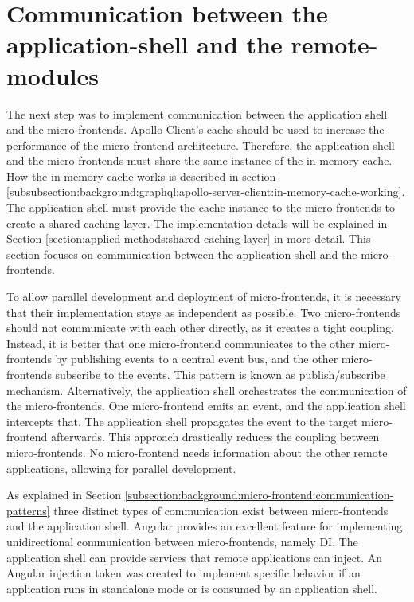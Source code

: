 \section{Communication between the application-shell and the remote-modules}\label{section:applied-methods:communication-shell-remote}

The next step was to implement communication between the application shell and the micro-frontends. Apollo Client's cache should be used to increase the performance of the micro-frontend architecture. Therefore, the application shell and the micro-frontends must share the same instance of the in-memory cache. How the in-memory cache works is described in section  \ref{subsubsection:background:graphql:apollo-server-client:in-memory-cache-working}. The application shell must provide the cache instance to the micro-frontends to create a shared caching layer. The implementation details will be explained in Section \ref{section:applied-methods:shared-caching-layer} in more detail. This section focuses on communication between the application shell and the micro-frontends.

\bigskip

\noindent To allow parallel development and deployment of micro-frontends, it is necessary that their implementation stays as independent as possible. Two micro-frontends should not communicate with each other directly, as it creates a tight coupling. Instead, it is better that one micro-frontend communicates to the other micro-frontends by publishing events to a central event bus, and the other micro-frontends subscribe to the events. This pattern is known as publish/subscribe mechanism. Alternatively, the application shell orchestrates the communication of the micro-frontends. One micro-frontend emits an event, and the application shell intercepts that. The application shell propagates the event to the target micro-frontend afterwards. This approach drastically reduces the coupling between micro-frontends. No micro-frontend needs information about the other remote applications, allowing for parallel development.

\bigskip

\noindent As explained in Section \ref{subsection:background:micro-frontend:communication-patterns} three distinct types of communication exist between micro-frontends and the application shell. Angular provides an excellent feature for implementing unidirectional communication between micro-frontends, namely \ac{DI}. The application shell can provide services that remote applications can inject. An Angular injection token was created to implement specific behavior if an application runs in standalone mode or is consumed by an application shell.

